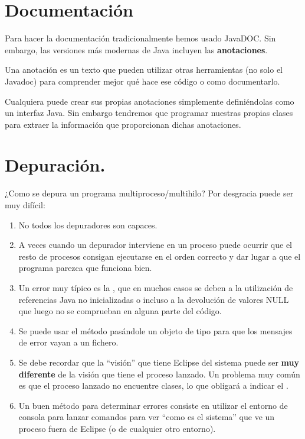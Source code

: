 \documentclass[a4paper,12pt,spanish]{sphinxmanual}
\begin{document}
\section{Documentación}
\label{textos/tema1:documentacion}
Para hacer la documentación tradicionalmente hemos usado JavaDOC. Sin embargo, las versiones más modernas de Java incluyen las \textbf{anotaciones}.

Una anotación es un texto que pueden utilizar otras herramientas (no solo el Javadoc) para comprender mejor qué hace ese código o como documentarlo.

Cualquiera puede crear sus propias anotaciones simplemente definiéndolas como un interfaz Java. Sin embargo tendremos que programar nuestras propias clases para extraer la información que proporcionan dichas anotaciones.


\section{Depuración.}
\label{textos/tema1:depuracion}
¿Como se depura un programa multiproceso/multihilo? Por desgracia puede ser muy difícil:
\begin{enumerate}
\item {} 
No todos los depuradores son capaces.

\item {} 
A veces cuando un depurador interviene en un proceso puede ocurrir que el resto de procesos consigan ejecutarse en el orden correcto y dar lugar a que el programa parezca que funciona bien.

\item {} 
Un error muy típico es la , que en muchos casos se deben a la utilización de referencias Java no inicializadas o incluso a la devolución de valores NULL que luego no se comprueban en alguna parte del código.

\item {} 
Se puede usar el método  pasándole un objeto de tipo  para que los mensajes de error vayan a un fichero.

\item {} 
Se debe recordar que la ``visión'' que tiene Eclipse del sistema puede ser \textbf{muy diferente} de la visión que tiene el proceso lanzado. Un problema muy común es que el proceso lanzado no encuentre clases, lo que obligará a indicar el .

\item {} 
Un buen método para determinar errores consiste en utilizar el entorno de consola para lanzar comandos para ver ``como es el sistema'' que ve un proceso fuera de Eclipse (o de cualquier otro entorno).

\end{enumerate}
\end{document}
